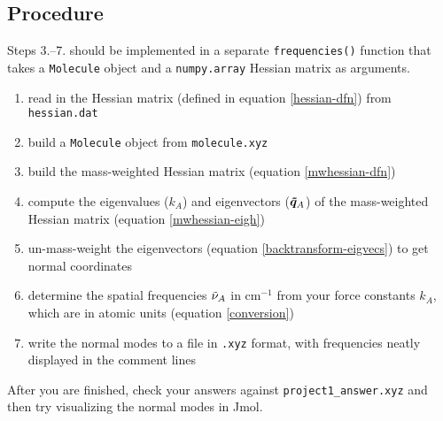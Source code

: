 \documentclass[fleqn]{article}
\newcommand{\linl}[1]{\lstinline{#1}{}}
\newcommand{\n}{\nu}         %
\newcommand{\tl}{\ensuremath{\tilde}}
\newcommand{\mr}[1]{\ensuremath{\mathrm{#1}}}
\begin{document}
\subsection*{Procedure}

Steps 3.--7. should be implemented in a separate \linl{frequencies()} function that takes a \linl{Molecule} object and a \linl{numpy.array} Hessian matrix as arguments.
\begin{enumerate}
  \item read in the Hessian matrix (defined in equation \ref{hessian-dfn}) from \linl{hessian.dat}
  \item build a \linl{Molecule} object from \linl{molecule.xyz}
  \item build the mass-weighted Hessian matrix (equation \ref{mwhessian-dfn})
  \item compute the eigenvalues ($k_A$) and eigenvectors ($\bm{\tl{q}}_A$) of the mass-weighted Hessian matrix (equation \ref{mwhessian-eigh})
  \item un-mass-weight the eigenvectors (equation \ref{backtransform-eigvecs}) to get normal coordinates
  \item determine the spatial frequencies $\tl{\n}_A$ in $\mr{cm}^{-1}$ from your force constants $k_A$, which are in atomic units (equation \ref{conversion})
  \item write the normal modes to a file in \linl{.xyz} format, with frequencies neatly displayed in the comment lines
\end{enumerate}
After you are finished, check your answers against \linl{project1_answer.xyz} and then try visualizing the normal modes in Jmol.

\newpage
\end{document}
